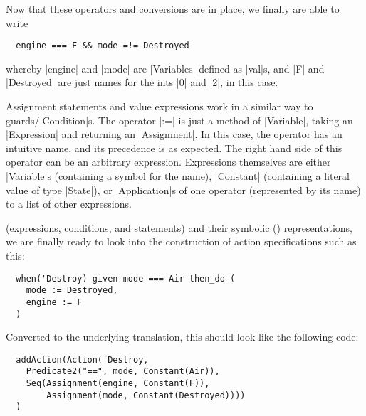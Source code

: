 Now that these operators and conversions are in place, we finally are able to write
\begin{lstlisting}
  engine === F && mode =!= Destroyed
\end{lstlisting}
whereby |engine| and |mode| are |Variables| defined as |val|s, and |F| and |Destroyed| are just
names for the ints |0| and |2|, in this case.

Assignment statements and value expressions work in a similar way to guards\slash |Condition|s. The
operator |:=| is just a method of |Variable|, taking an |Expression| and returning an
|Assignment|. In this case, the operator has an intuitive name, and its precedence is as
expected. The right hand side of this operator can be an arbitrary expression.  Expressions
themselves are either |Variable|s (containing a symbol for the name), |Constant| (containing a
literal value of type |State|), or |Application|s of one operator (represented by its name) to a
list of other expressions.


 (expressions, conditions, and statements) and their
symbolic (\dsl{}) representations, we are finally ready to look into the construction of action
specifications such as this:
\begin{lstlisting}
  when('Destroy) given mode === Air then_do (
    mode := Destroyed,
    engine := F
  )
\end{lstlisting}
Converted to the underlying  translation, this should look like the following code:
\begin{lstlisting}
  addAction(Action('Destroy,
    Predicate2("==", mode, Constant(Air)),
    Seq(Assignment(engine, Constant(F)), 
        Assignment(mode, Constant(Destroyed))))
  )
\end{lstlisting}


